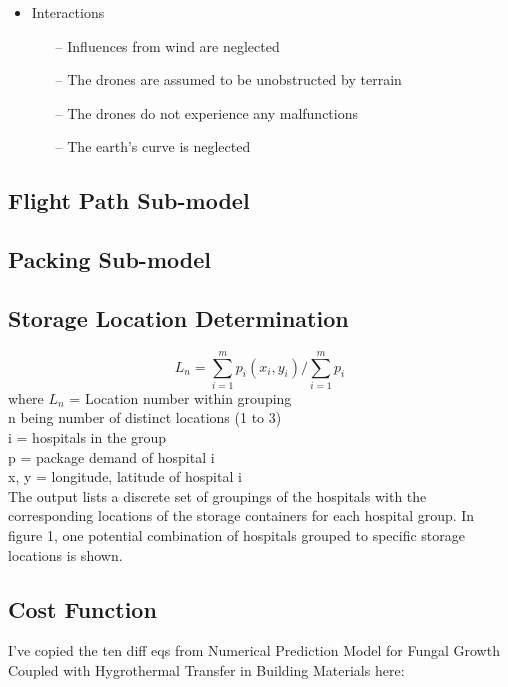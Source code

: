 \documentclass[12pt]{article}
\begin{document}
\begin{multicols}{2}
\begin{itemize}
\begin{itemize}
	\end{itemize}
	\item Interactions
	\begin{itemize}
		\item[--] Influences from wind are neglected
		\item[--] The drones are assumed to be unobstructed by terrain
		\item[--] The drones do not experience any malfunctions
		\item[--] The earth’s curve is neglected
	\end{itemize}
\end{itemize}


\subsection{Flight Path Sub-model}
\lipsum[3]

\subsection{Packing Sub-model}
\lipsum[4]

\subsection{Storage Location Determination}
\lipsum[5]
\[ 
L_n = \sum_{i=1}^{m} p_i(x_i, y_i) / \sum_{i=1}^{m} p_i 
\]
where $L_n$ = Location number within grouping \\
n being number of distinct locations (1 to 3) \\
i = hospitals in the group \\
p = package demand of hospital i \\
x, y = longitude, latitude of hospital i \\
The output lists a discrete set of groupings of the hospitals with the corresponding locations of the storage containers for each hospital group. In figure 1, one potential combination of hospitals grouped to specific storage locations is shown. 



\subsection{Cost Function}
I've copied the ten diff eqs from Numerical Prediction Model for Fungal Growth Coupled with Hygrothermal Transfer in Building Materials here:


\end{multicols}
\end{document}
